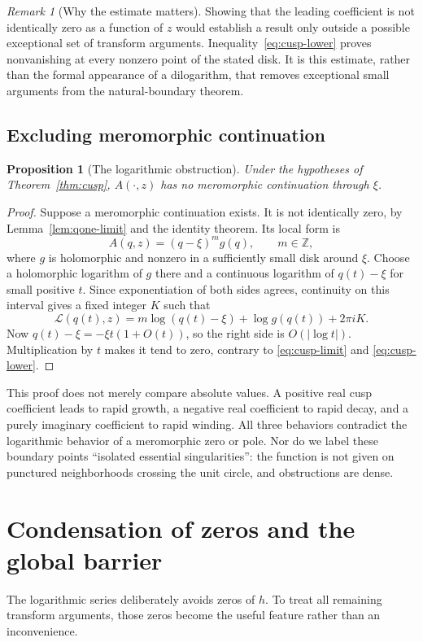 \documentclass[11pt,a4paper]{article}
\numberwithin{equation}{section}
\newtheorem{proposition}[theorem]{Proposition}
\theoremstyle{definition}
\theoremstyle{remark}
\newtheorem{remark}[theorem]{Remark}
\newcommand{\Z}{\mathbb Z}
\newcommand{\LL}{\mathcal L}
\begin{document}
\begin{remark}[Why the estimate matters]
Showing that the leading coefficient is not identically zero as a function of \(z\) would establish a result only outside a possible exceptional set of transform arguments. Inequality~\eqref{eq:cusp-lower} proves nonvanishing at every nonzero point of the stated disk. It is this estimate, rather than the formal appearance of a dilogarithm, that removes exceptional small arguments from the natural-boundary theorem.
\end{remark}

\subsection{Excluding meromorphic continuation}
\begin{proposition}[The logarithmic obstruction]\label{prop:cusp-obstruction}
Under the hypotheses of Theorem~\ref{thm:cusp}, \(A(\cdot,z)\) has no meromorphic continuation through \(\xi\).
\end{proposition}
\begin{proof}
Suppose a meromorphic continuation exists. It is not identically zero, by Lemma~\ref{lem:qone-limit} and the identity theorem. Its local form is
\[
 A(q,z)=(q-\xi)^m g(q),\qquad m\in\Z,
\]
where \(g\) is holomorphic and nonzero in a sufficiently small disk around \(\xi\). Choose a holomorphic logarithm of \(g\) there and a continuous logarithm of \(q(t)-\xi\) for small positive \(t\). Since exponentiation of both sides agrees, continuity on this interval gives a fixed integer \(K\) such that
\[
 \LL(q(t),z)=m\log(q(t)-\xi)+\log g(q(t))+2\pi iK.
\]
Now \(q(t)-\xi=-\xi t(1+O(t))\), so the right side is \(O(|\log t|)\). Multiplication by \(t\) makes it tend to zero, contrary to \eqref{eq:cusp-limit} and \eqref{eq:cusp-lower}.
\end{proof}

This proof does not merely compare absolute values. A positive real cusp coefficient leads to rapid growth, a negative real coefficient to rapid decay, and a purely imaginary coefficient to rapid winding. All three behaviors contradict the logarithmic behavior of a meromorphic zero or pole. Nor do we label these boundary points ``isolated essential singularities'': the function is not given on punctured neighborhoods crossing the unit circle, and obstructions are dense.

\section{Condensation of zeros and the global barrier}
The logarithmic series deliberately avoids zeros of \(h\). To treat all remaining transform arguments, those zeros become the useful feature rather than an inconvenience.
\end{document}

